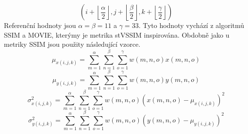 \documentclass[thesis=M,czech]{FITthesis}[2016/06/26]
\begin{document}
$$(i+\left \lfloor{\frac{\alpha}{2}}\right \rfloor,j+\left \lfloor{\frac{\beta}{2}}\right \rfloor,k+\left \lfloor{\frac{\gamma}{2}}\right \rfloor)$$
Referenční hodnoty jsou $\alpha=\beta=11$ a $\gamma=33$. Tyto hodnoty vychází z algoritmů SSIM a MOVIE, kterýmy je metrika stVSSIM inspirována. Obdobně jako u metriky SSIM jsou použity následující vzorce.
\begin{equation} 
\mu_{x(i,j,k)} = \sum_{m=1}^{\alpha}\sum_{n=1}^{\beta}\sum_{o=1}^{\gamma}w(m,n,o)x(m,n,o)
\end{equation}
\begin{equation} 
\mu_{y(i,j,k)} = \sum_{m=1}^{\alpha}\sum_{n=1}^{\beta}\sum_{o=1}^{\gamma}w(m,n,o)y(m,n,o)
\end{equation}
\begin{equation} 
\sigma_{x(i,j,k)}^2 = \sum_{m=1}^{\alpha}\sum_{n=1}^{\beta}\sum_{o=1}^{\gamma}w(m,n,o)(x(m,n,o)-\mu_{x(i,j,k)})^2
\end{equation}
\begin{equation} 
\sigma_{y(i,j,k)}^2 = \sum_{m=1}^{\alpha}\sum_{n=1}^{\beta}\sum_{o=1}^{\gamma}w(m,n,o)(y(m,n,o)-\mu_{y(i,j,k)})^2
\end{equation}
\end{document}
